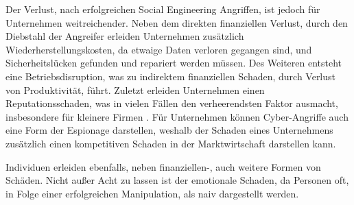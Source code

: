 Der Verlust, nach erfolgreichen Social Engineering Angriffen, ist jedoch für Unterneh\-men weitreichender.
Neben dem direkten finanziellen Verlust, durch den Diebstahl der Angreifer erleiden Unternehmen zusätzlich
Wiederherstellungskosten, da etwaige Daten verloren gegangen sind, und Sicherheitslücken gefunden und repariert
werden müssen. Des Weiteren entsteht eine Betriebsdisruption, was zu indirektem finanziellen Schaden, durch
Verlust von Produktivität, führt. Zuletzt erleiden Unternehmen einen Reputationsschaden, was in vielen Fällen
den verheerendsten Faktor ausmacht, insbesondere für kleinere Firmen .
Für Unternehmen können Cyber-Angriffe auch eine Form der Espionage darstellen, weshalb der Schaden eines
Unternehmens zusätzlich einen kompetitiven Schaden in der Marktwirtschaft darstellen kann.

Individuen erleiden ebenfalls, neben finanziellen-, auch weitere Formen von Schäden.
Nicht außer Acht zu lassen ist der emotionale Schaden, da Personen oft, in Folge einer erfolgreichen
Manipulation, als naiv dargestellt werden.














